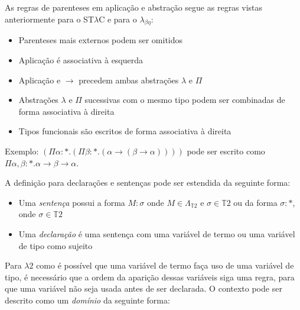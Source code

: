 \documentclass[../main.tex]{subfiles}
\begin{document}
As regras de parenteses em aplicação e abstração segue as regras vistas anteriormente para o ST$\lambda$C e para o $\lambda_{\beta\eta}$:

\begin{itemize}
    \item Parenteses mais externos podem ser omitidos
    \item Aplicação é associativa à esquerda
    \item Aplicação e $\to$ precedem ambas abstrações $\lambda$ e $\Pi$
    \item Abstrações $\lambda$ e $\Pi$ sucessivas com o mesmo tipo podem ser combinadas de forma associativa à direita
    \item Tipos funcionais são escritos de forma associativa à direita
\end{itemize}

Exemplo: $(\Pi \alpha : \ast . (\Pi \beta : \ast . (\alpha \to (\beta \to \alpha))))$ pode ser escrito como $\Pi \alpha, \beta : \ast . \alpha \to \beta \to \alpha$.

A definição para declarações e sentenças pode ser estendida da seguinte forma:

\begin{definition}
    \hfil
    \begin{itemize}
        \item Uma \emph{sentença} possui a forma $M : \sigma$ onde $M \in \Lambda_{\mathbb{T}2}$ e $\sigma \in \mathbb{T}2$ ou da forma $\sigma : \ast$, onde $\sigma \in \mathbb{T}2$
        \item Uma \emph{declaração} é uma sentença com uma variável de termo ou uma variável de tipo como sujeito
    \end{itemize}
\end{definition}

Para $\lambda2$ como é possível que uma variável de termo faça uso de uma variável de tipo, é necessário que a ordem da aparição dessas variáveis siga uma regra, para que uma variável não seja usada antes de ser declarada. O contexto pode ser descrito como um \emph{domínio} da seguinte forma:
\end{document}
